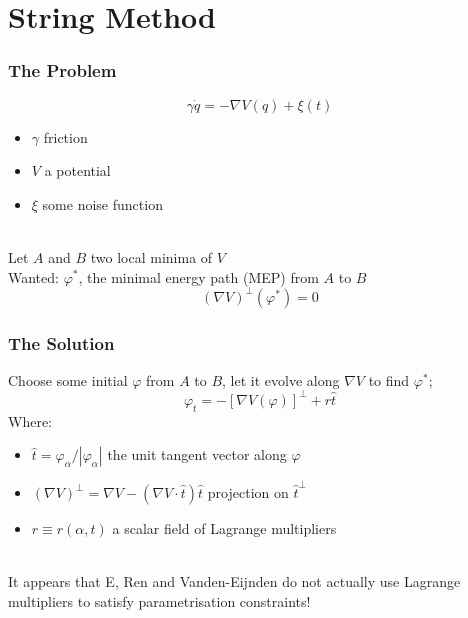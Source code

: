 \documentclass{beamer}
\renewcommand{\phi}{\varphi}
\renewcommand{\(}{\left(}
\renewcommand{\)}{\right)}
\begin{document}
\section{String Method}
\begin{frame}
\frametitle{The Problem}
$$\gamma \dot{q} = -\nabla V(q)+\xi(t)$$
\begin{itemize}
\item $\gamma$ friction
\item $V$ a potential
\item $\xi$ some noise function
\end{itemize}
~\\
Let $A$ and $B$ two local minima of $V$\\
Wanted: $\phi^*$, the minimal energy path (MEP) from $A$ to $B$
$$(\nabla V)^\bot(\phi^*)=0$$
\end{frame}

\begin{frame}
\frametitle{The Solution}
Choose some initial $\phi$ from $A$ to $B$, let it evolve along $\nabla V$ to find $\phi^*$;
$$\phi_t=-[\nabla V(\phi)]^\bot+r\hat t$$
Where:
\begin{itemize}
\item $\hat t = {\phi_\alpha}/{|\phi_\alpha|}$\hspace{2em} the unit tangent vector along $\phi$
\item $(\nabla V)^\bot = \nabla V - (\nabla V \cdot \hat t)\hat t$\hspace{2em}  projection on $\hat t^\bot$ 
\item $r \equiv r(\alpha, t)$ \hspace{2em}a scalar field of Lagrange multipliers
\end{itemize}
~\\
It appears that E, Ren and Vanden-Eijnden do not actually use Lagrange multipliers to satisfy parametrisation constraints!%
\end{frame}
\end{document}
